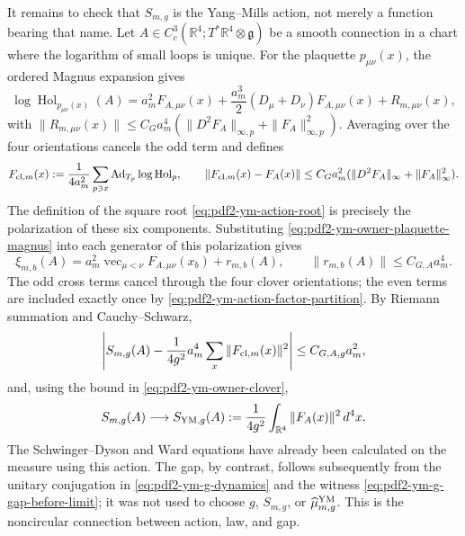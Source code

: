 It remains to check that $S_{m,g}$ is the Yang--Mills action, not merely a
function bearing that name. Let
$A\in C_c^3(\mathbb R^4;T^*\mathbb R^4\otimes\mathfrak g)$ be a smooth connection in
a chart where the logarithm of small loops is unique. For the plaquette
$p_{\mu\nu}(x)$, the ordered Magnus expansion gives
\begin{equation}\label{eq:pdf2-ym-owner-plaquette-magnus}
 \log\operatorname{Hol}_{p_{\mu\nu}(x)}(A)
 =a_m^2F_{A,\mu\nu}(x)
  +\frac{a_m^3}{2}(D_\mu+D_\nu)F_{A,\mu\nu}(x)
  +R_{m,\mu\nu}(x),
\end{equation}
with
$\|R_{m,\mu\nu}(x)\|\le C_G a_m^4
(\|D^2F_A\|_{\infty,p}+\|F_A\|_{\infty,p}^2)$.
Averaging over the four orientations cancels the odd term and defines
\begin{equation}\label{eq:pdf2-ym-owner-clover}
 F_{{\rm cl},m}(x)
 :=\frac1{4a_m^2}\sum_{p\ni x}
  \operatorname{Ad}_{T_p}\log\operatorname{Hol}_p,
 \qquad
 \|F_{{\rm cl},m}(x)-F_A(x)\|
 \le C_G a_m^2(\|D^2F_A\|_\infty+\|F_A\|_\infty^2).
\end{equation}
The definition of the square root
\eqref{eq:pdf2-ym-action-root} is precisely the polarization of these six
components. Substituting \eqref{eq:pdf2-ym-owner-plaquette-magnus} into each
generator of this polarization gives
\begin{equation}\label{eq:pdf2-ym-owner-action-root-smooth-chart}
 \xi_{m,b}(A)
 =a_m^2\operatorname{vec}_{\mu<\nu}F_{A,\mu\nu}(x_b)
  +r_{m,b}(A),
 \qquad
 \|r_{m,b}(A)\|\le C_{G,A}a_m^4.
\end{equation}
The odd cross terms cancel through the four clover orientations;
the even terms are included exactly once by
\eqref{eq:pdf2-ym-action-factor-partition}. By Riemann summation and
Cauchy--Schwarz,
\begin{equation}\label{eq:pdf2-ym-owner-action-error}
 \left|S_{m,g}(A)-\frac1{4g^2}
  a_m^4\sum_x\|F_{{\rm cl},m}(x)\|^2\right|
 \le C_{G,A,g}a_m^2,
\end{equation}
and, using the bound in \eqref{eq:pdf2-ym-owner-clover},
\begin{equation}\label{eq:pdf2-ym-owner-f2}
 S_{m,g}(A)\longrightarrow
 S_{{\rm YM},g}(A):=\frac1{4g^2}
 \int_{\mathbb R^4}\|F_A(x)\|^2\,d^4x.
\end{equation}
The Schwinger--Dyson and Ward equations have already been calculated on the measure using
this action. The gap, by contrast, follows subsequently from the unitary conjugation in
\eqref{eq:pdf2-ym-g-dynamics} and the witness
\eqref{eq:pdf2-ym-g-gap-before-limit}; it was not used to choose $g$, $S_{m,g}$, or
$\widehat\mu_{m,g}^{\rm YM}$. This is the noncircular connection between action, law, and gap.

